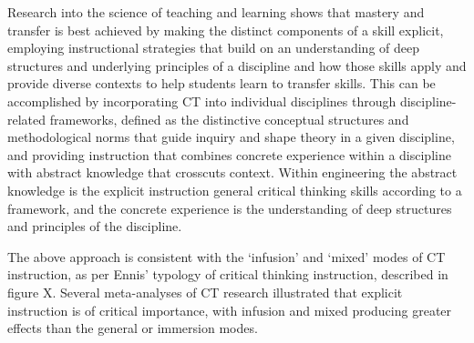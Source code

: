 Research into the science of teaching and learning shows that mastery and transfer is best achieved by making the distinct components of a skill explicit, employing instructional strategies that build on an understanding of deep structures and underlying principles of a discipline and how those skills apply and provide diverse contexts to help students learn to transfer skills. This can be accomplished by incorporating CT into individual disciplines through discipline-related frameworks, defined as the distinctive conceptual structures and methodological norms that guide inquiry and shape theory in a given discipline, and providing instruction that combines concrete experience within a discipline with abstract knowledge that crosscuts context\cite{Ambrose:2010uh}. Within engineering the abstract knowledge is the explicit instruction general critical thinking skills according to a framework, and the concrete experience is the understanding of deep structures and principles of the discipline\cite{Smith:2002df}.  

The above approach is consistent with the ‘infusion’ and ‘mixed’ modes of CT instruction, as per Ennis’ typology of critical thinking instruction, described in figure X.  Several meta-analyses of CT research illustrated that explicit instruction is of critical importance, with infusion and mixed producing greater effects than the general or immersion modes\cite{Abrami:2008ew, Abrami:2014cs, BeharHorenstein:2011tf,}.  